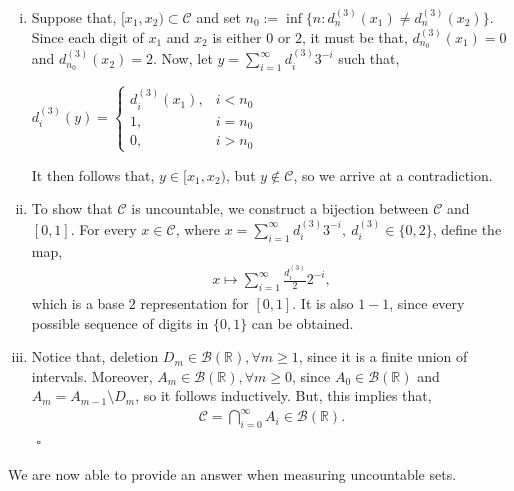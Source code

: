 \documentclass{article}
\begin{document}
\begin{enumerate}[(i)]
	\item Suppose that, $[x_1, x_2) \subset \mathcal{C}$ and set $n_0 := \inf\{n: d_n^{(3)}(x_1) \neq d_n^{(3)}(x_2)\}$. Since each digit of $x_1$ and $x_2$ is either $0$ or $2$, it must be that, $d_{n_0}^{(3)}(x_1) = 0$ and $d_{n_0}^{(3)}(x_2) = 2$. Now, let $y = \sum_{i=1}^{\infty}d_i^{(3)}3^{-i}$ such that,
	\begin{center}
	$d_i^{(3)}(y) =
	\begin{cases}
	d_i^{(3)}(x_1), & i < n_0\\
	1, & i = n_0\\
	0, & i > n_0
	\end{cases}$
	\end{center}
	It then follows that, $y \in [x_1, x_2)$, but $y \notin \mathcal{C}$, so we arrive at a contradiction.
	\item To show that $\mathcal{C}$ is uncountable, we construct a bijection between $\mathcal{C}$ and $[0,1]$. For every $x \in \mathcal{C}$, where $x = \sum_{i=1}^{\infty}d_i^{(3)}3^{-i}, \ d_i^{(3)} \in \{0,2\}$, define the map,
	\begin{eqnarray}
	\nonumber
	x \mapsto \sum_{i=1}^{\infty}\frac{d_i^{(3)}}{2}2^{-i},
	\end{eqnarray}
	which is a base $2$ representation for $[0,1]$. It is also $1-1$, since every possible sequence of digits in $\{0,1\}$ can be obtained.
	\item Notice that, deletion $D_m \in \mathcal{B}(\mathbb{R}), \forall m \geq 1$, since it is a finite union of intervals. Moreover, $A_m \in \mathcal{B}(\mathbb{R}), \forall m \geq 0$, since $A_0 \in \mathcal{B}(\mathbb{R})$ and $A_m = A_{m-1} \setminus D_m$, so it follows inductively. But, this implies that,
	\begin{eqnarray}
	\nonumber
	\mathcal{C} = \bigcap_{i=0}^{\infty}A_i \in \mathcal{B}(\mathbb{R}).
	\end{eqnarray}
	${}$ \hfill $\square$
\end{enumerate}
We are now able to provide an answer when measuring uncountable sets.\\\\
\noindent{}\\\\\\
\end{document}
